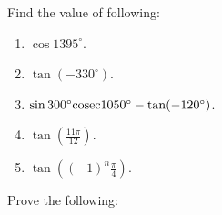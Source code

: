 Find the value of following:

\begin{enumerate}[resume]
\item $\cos 1395^\circ$.

\item $\tan(-330^\circ)$.

\item $\sin 300^\circ {\rm cosec} 1050^\circ - \tan(-120^\circ)$.

\item $\tan\left(\frac{11\pi}{12}\right)$.

\item $\tan \left((-1)^n\frac{\pi}{4}\right)$.
\end{enumerate}

Prove the following:

